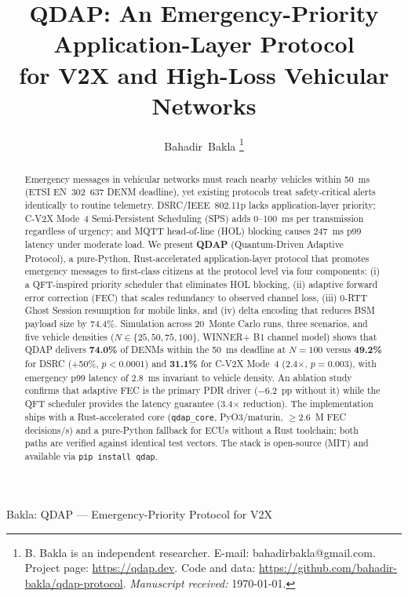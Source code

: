 \documentclass[journal]{IEEEtran}
\begin{document}

\title{QDAP: An Emergency-Priority Application-Layer Protocol\\
       for V2X and High-Loss Vehicular Networks}

\author{Bahadir~Bakla%
\thanks{B. Bakla is an independent researcher.
E-mail: bahadirbakla@gmail.com.
Project page: \url{https://qdap.dev}.
Code and data: \url{https://github.com/bahadir-bakla/qdap-protocol}.
\textit{Manuscript received:} \today.}}

%
{Bakla: QDAP — Emergency-Priority Protocol for V2X}

\maketitle


\begin{abstract}

Emergency messages in vehicular networks must reach nearby vehicles within
\SI{50}{\milli\second} (ETSI EN~302~637 DENM deadline), yet existing protocols
treat safety-critical alerts identically to routine telemetry.
DSRC/IEEE~802.11p lacks application-layer priority; C-V2X Mode~4
Semi-Persistent Scheduling (SPS) adds 0–\SI{100}{\milli\second} per
transmission regardless of urgency; and MQTT head-of-line (HOL) blocking
causes \SI{247}{\milli\second} p99 latency under moderate load.
We present \textbf{QDAP} (Quantum-Driven Adaptive Protocol), a
pure-Python, Rust-accelerated application-layer protocol that promotes
emergency messages to first-class citizens at the protocol level via four
components: (i) a QFT-inspired priority scheduler that eliminates HOL blocking,
(ii) adaptive forward error correction (FEC) that scales redundancy to observed
channel loss, (iii) 0-RTT Ghost Session resumption for mobile links, and
(iv) delta encoding that reduces BSM payload size by 74.4\%.
Simulation across 20~Monte Carlo runs, three scenarios, and five vehicle
densities ($N \in \{25,50,75,100\}$, WINNER+ B1 channel model) shows that
QDAP delivers \textbf{74.0\%} of DENMs within the 50~ms deadline at $N{=}100$
versus \textbf{49.2\%} for DSRC (+50\%, $p < 0.0001$) and \textbf{31.1\%}
for C-V2X Mode~4 (2.4$\times$, $p{=}0.003$), with emergency p99 latency of
\SI{2.8}{\milli\second} invariant to vehicle density.
An ablation study confirms that adaptive FEC is the primary PDR driver
($-6.2$~pp without it) while the QFT scheduler provides the latency guarantee
(3.4$\times$ reduction).
The implementation ships with a Rust-accelerated core (\texttt{qdap\_core},
PyO3/maturin, $\geq$2.6~M FEC decisions/s) and a pure-Python fallback for
ECUs without a Rust toolchain; both paths are verified against identical test
vectors.
The stack is open-source (MIT) and available via \texttt{pip install qdap}.
\end{abstract}
\end{document}
